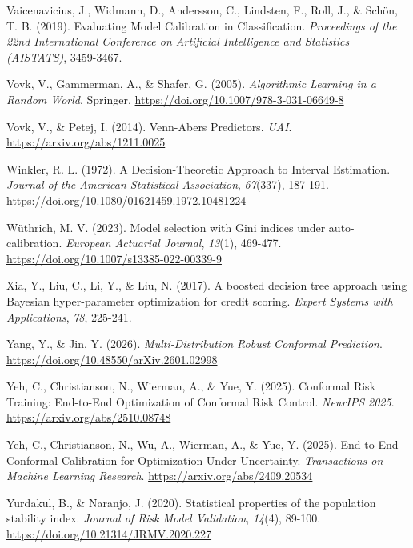 \documentclass[
  spanish,
  11pt,
  letterpaper,
]{scrbook}
\newlength{\cslhangindent}
\newenvironment{CSLReferences}[2] %
 {\begin{list}{}{%
  \setlength{\itemindent}{0pt}
  \setlength{\leftmargin}{0pt}
  \setlength{\parsep}{0pt}
  \ifodd #1
   \setlength{\leftmargin}{\cslhangindent}
   \setlength{\itemindent}{-1\cslhangindent}
  \fi
  \setlength{\itemsep}{#2\baselineskip}}}
 {\end{list}}
\theoremstyle{plain}
\theoremstyle{remark}
\begin{document}
\begin{CSLReferences}{1}{0}
Vaicenavicius, J., Widmann, D., Andersson, C., Lindsten, F., Roll, J.,
\& Schön, T. B. (2019). Evaluating Model Calibration in Classification.
\emph{Proceedings of the 22nd International Conference on Artificial
Intelligence and Statistics (AISTATS)}, 3459-3467.

Vovk, V., Gammerman, A., \& Shafer, G. (2005). \emph{Algorithmic
Learning in a Random World}. Springer.
\url{https://doi.org/10.1007/978-3-031-06649-8}

Vovk, V., \& Petej, I. (2014). Venn-{Abers} Predictors. \emph{UAI}.
\url{https://arxiv.org/abs/1211.0025}

Winkler, R. L. (1972). A Decision-Theoretic Approach to Interval
Estimation. \emph{Journal of the American Statistical Association},
\emph{67}(337), 187-191.
\url{https://doi.org/10.1080/01621459.1972.10481224}

Wüthrich, M. V. (2023). Model selection with Gini indices under
auto-calibration. \emph{European Actuarial Journal}, \emph{13}(1),
469-477. \url{https://doi.org/10.1007/s13385-022-00339-9}

Xia, Y., Liu, C., Li, Y., \& Liu, N. (2017). A boosted decision tree
approach using {Bayesian} hyper-parameter optimization for credit
scoring. \emph{Expert Systems with Applications}, \emph{78}, 225-241.

Yang, Y., \& Jin, Y. (2026). \emph{Multi-Distribution Robust Conformal
Prediction}. \url{https://doi.org/10.48550/arXiv.2601.02998}

Yeh, C., Christianson, N., Wierman, A., \& Yue, Y. (2025). Conformal
Risk Training: End-to-End Optimization of Conformal Risk Control.
\emph{NeurIPS 2025}. \url{https://arxiv.org/abs/2510.08748}

Yeh, C., Christianson, N., Wu, A., Wierman, A., \& Yue, Y. (2025).
End-to-End Conformal Calibration for Optimization Under Uncertainty.
\emph{Transactions on Machine Learning Research}.
\url{https://arxiv.org/abs/2409.20534}

Yurdakul, B., \& Naranjo, J. (2020). Statistical properties of the
population stability index. \emph{Journal of Risk Model Validation},
\emph{14}(4), 89-100. \url{https://doi.org/10.21314/JRMV.2020.227}


\end{CSLReferences}
\end{document}
